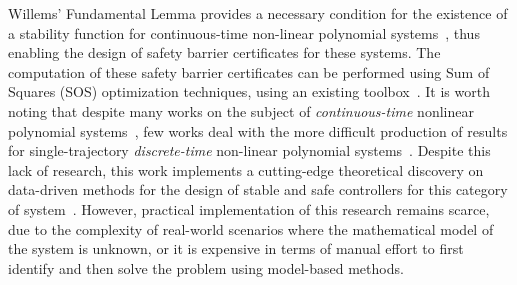 \documentclass[sigconf]{acmart}
\begin{document}

Willems' Fundamental Lemma provides a necessary condition for the existence of a stability function for continuous-time non-linear polynomial systems~\cite{willems2005note}, thus enabling the design of safety barrier certificates for these systems.
The computation of these safety barrier certificates can be performed using Sum of Squares (SOS) optimization techniques, using an existing toolbox~\cite{prajna2002introducing}.
It is worth noting that despite many works on the subject of \emph{continuous-time} nonlinear polynomial systems~\cite{bisoffi2020data,bisoffi2022controller,nejati2022data}, few works deal with the more difficult production of results for single-trajectory \emph{discrete-time} non-linear polynomial systems~\cite{martin2023guarantees}.
Despite this lack of research, this work implements a cutting-edge theoretical discovery on data-driven methods for the design of stable and safe controllers for this category of system~\cite{samari2024single}.
However, practical implementation of this research remains scarce, due to the complexity of real-world scenarios where the mathematical model of the system is unknown, or it is expensive in terms of manual effort to first identify and then solve the problem using model-based methods.
\end{document}
